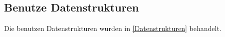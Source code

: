 \subsection{Benutze Datenstrukturen}
    Die benutzen Datenstrukturen wurden in \ref{Datenstrukturen} behandelt.
   
  

